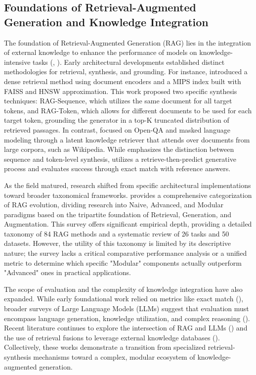 \documentclass[11pt]{article}
\begin{document}
\subsection{Foundations of Retrieval-Augmented Generation and Knowledge Integration}

The foundation of Retrieval-Augmented Generation (RAG) lies in the integration of external knowledge to enhance the performance of models on knowledge-intensive tasks (\citep{2312.10997}, \citep{2407.13193}). Early architectural developments established distinct methodologies for retrieval, synthesis, and grounding. For instance, \citep{2005.11401} introduced a dense retrieval method using document encoders and a MIPS index built with FAISS and HNSW approximation. This work proposed two specific synthesis techniques: RAG-Sequence, which utilizes the same document for all target tokens, and RAG-Token, which allows for different documents to be used for each target token, grounding the generator in a top-K truncated distribution of retrieved passages. In contrast, \citep{2002.08909} focused on Open-QA and masked language modeling through a latent knowledge retriever that attends over documents from large corpora, such as Wikipedia. While \citep{2005.11401} emphasizes the distinction between sequence and token-level synthesis, \citep{2002.08909} utilizes a retrieve-then-predict generative process and evaluates success through exact match with reference answers.

As the field matured, research shifted from specific architectural implementations toward broader taxonomical frameworks. \citep{2312.10997} provides a comprehensive categorization of RAG evolution, dividing research into Naive, Advanced, and Modular paradigms based on the tripartite foundation of Retrieval, Generation, and Augmentation. This survey offers significant empirical depth, providing a detailed taxonomy of 84 RAG methods and a systematic review of 26 tasks and 50 datasets. However, the utility of this taxonomy is limited by its descriptive nature; the survey lacks a critical comparative performance analysis or a unified metric to determine which specific "Modular" components actually outperform "Advanced" ones in practical applications.

The scope of evaluation and the complexity of knowledge integration have also expanded. While early foundational work relied on metrics like exact match (\citep{2002.08909}), broader surveys of Large Language Models (LLMs) suggest that evaluation must encompass language generation, knowledge utilization, and complex reasoning (\citep{2303.18223}). Recent literature continues to explore the intersection of RAG and LLMs (\citep{2405.06211}) and the use of retrieval fusions to leverage external knowledge databases (\citep{2407.13193}). Collectively, these works demonstrate a transition from specialized retrieval-synthesis mechanisms toward a complex, modular ecosystem of knowledge-augmented generation.
\end{document}
